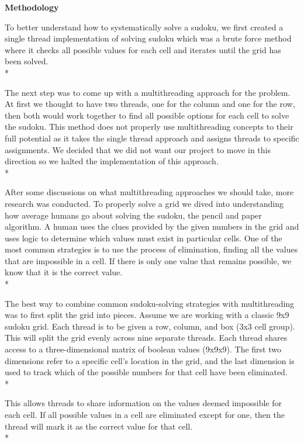 \documentclass[11pt]{article}
\begin{document}
\vspace{1\baselineskip}

\begin{center}
{\Large\textbf{Methodology}}
\end{center}


To better understand how to systematically solve a sudoku, we first created a single thread implementation of solving sudoku
which was a brute force method where it checks all possible values for each cell and iterates until the grid has been solved.
\\*

The next step was to come up with a multithreading approach for the problem. At first we thought to have two threads, one for the
column and one for the row, then both would work together to find all possible options for each cell to solve the sudoku.
This method does not properly use multithreading concepts to their full potential as it takes the single thread approach and assigns
threads to specific assignments. We decided that we did not want our project to move in this direction so we halted the
implementation of this approach.
\\*

After some discussions on what multithreading approaches we should take, more research was conducted.
To properly solve a grid we dived into understanding how average humans go about solving the sudoku, the pencil and paper algorithm.
A human uses the clues provided by the given numbers in the grid and uses logic to determine which values must
exist in particular cells. One of the most common strategies is to use the process of elimination, finding all the values that
are impossible in a cell. If there is only one value that remains possible, we know that it is the correct value.
\\*

The best way to combine common sudoku-solving strategies with multithreading was to first split the grid into pieces.
Assume we are working with a classic 9x9 sudoku grid. Each thread is to be given a row, column, and box (3x3 cell group).
This will split the grid evenly across nine separate threads. Each thread shares access to a three-dimensional matrix of boolean values
(9x9x9). The first two dimensions refer to a specific cell’s location in the grid, and the last dimension is used to track
which of the possible numbers for that cell have been eliminated.
\\*

This allows threads to share information on the values deemed impossible for each cell.
If all possible values in a cell are eliminated except for one, then the thread will mark it as the correct value for that cell.
\\*
\end{document}
